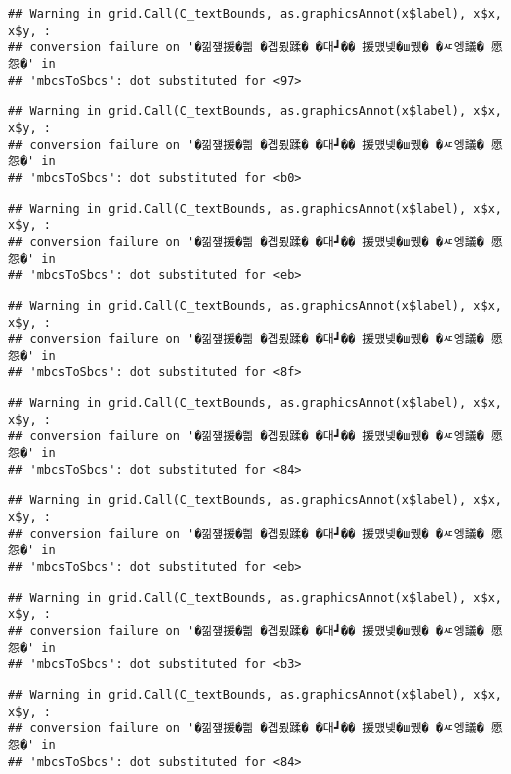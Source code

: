 \documentclass[
]{article}
\begin{document}
\begin{verbatim}
## Warning in grid.Call(C_textBounds, as.graphicsAnnot(x$label), x$x, x$y, :
## conversion failure on '�낆쟾援�쁾 �곕룄蹂� �대┛�� 援먰넻�ш퀬� �ㅼ엥議� 愿怨�' in
## 'mbcsToSbcs': dot substituted for <97>
\end{verbatim}

\begin{verbatim}
## Warning in grid.Call(C_textBounds, as.graphicsAnnot(x$label), x$x, x$y, :
## conversion failure on '�낆쟾援�쁾 �곕룄蹂� �대┛�� 援먰넻�ш퀬� �ㅼ엥議� 愿怨�' in
## 'mbcsToSbcs': dot substituted for <b0>
\end{verbatim}

\begin{verbatim}
## Warning in grid.Call(C_textBounds, as.graphicsAnnot(x$label), x$x, x$y, :
## conversion failure on '�낆쟾援�쁾 �곕룄蹂� �대┛�� 援먰넻�ш퀬� �ㅼ엥議� 愿怨�' in
## 'mbcsToSbcs': dot substituted for <eb>
\end{verbatim}

\begin{verbatim}
## Warning in grid.Call(C_textBounds, as.graphicsAnnot(x$label), x$x, x$y, :
## conversion failure on '�낆쟾援�쁾 �곕룄蹂� �대┛�� 援먰넻�ш퀬� �ㅼ엥議� 愿怨�' in
## 'mbcsToSbcs': dot substituted for <8f>
\end{verbatim}

\begin{verbatim}
## Warning in grid.Call(C_textBounds, as.graphicsAnnot(x$label), x$x, x$y, :
## conversion failure on '�낆쟾援�쁾 �곕룄蹂� �대┛�� 援먰넻�ш퀬� �ㅼ엥議� 愿怨�' in
## 'mbcsToSbcs': dot substituted for <84>
\end{verbatim}

\begin{verbatim}
## Warning in grid.Call(C_textBounds, as.graphicsAnnot(x$label), x$x, x$y, :
## conversion failure on '�낆쟾援�쁾 �곕룄蹂� �대┛�� 援먰넻�ш퀬� �ㅼ엥議� 愿怨�' in
## 'mbcsToSbcs': dot substituted for <eb>
\end{verbatim}

\begin{verbatim}
## Warning in grid.Call(C_textBounds, as.graphicsAnnot(x$label), x$x, x$y, :
## conversion failure on '�낆쟾援�쁾 �곕룄蹂� �대┛�� 援먰넻�ш퀬� �ㅼ엥議� 愿怨�' in
## 'mbcsToSbcs': dot substituted for <b3>
\end{verbatim}

\begin{verbatim}
## Warning in grid.Call(C_textBounds, as.graphicsAnnot(x$label), x$x, x$y, :
## conversion failure on '�낆쟾援�쁾 �곕룄蹂� �대┛�� 援먰넻�ш퀬� �ㅼ엥議� 愿怨�' in
## 'mbcsToSbcs': dot substituted for <84>
\end{verbatim}
\end{document}
